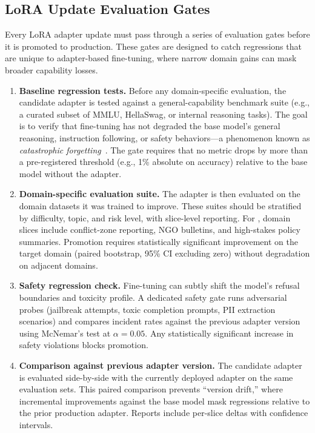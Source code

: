 \subsection{LoRA Update Evaluation Gates}
\label{subsec:ch04-lora-eval-gates}

Every LoRA adapter update must pass through a series of evaluation gates before it is promoted to production. These gates are designed to catch regressions that are unique to adapter-based fine-tuning, where narrow domain gains can mask broader capability losses.

\begin{enumerate}
    \item \textbf{Baseline regression tests.} Before any domain-specific evaluation, the candidate adapter is tested against a general-capability benchmark suite (e.g., a curated subset of MMLU, HellaSwag, or internal reasoning tasks). The goal is to verify that fine-tuning has not degraded the base model's general reasoning, instruction following, or safety behaviors---a phenomenon known as \emph{catastrophic forgetting}~. The gate requires that no metric drops by more than a pre-registered threshold (e.g., 1\% absolute on accuracy) relative to the base model without the adapter.

    \item \textbf{Domain-specific evaluation suite.} The adapter is then evaluated on the domain datasets it was trained to improve. These suites should be stratified by difficulty, topic, and risk level, with slice-level reporting. For \ishtar{}, domain slices include conflict-zone reporting, NGO bulletins, and high-stakes policy summaries. Promotion requires statistically significant improvement on the target domain (paired bootstrap, 95\% CI excluding zero) without degradation on adjacent domains.

    \item \textbf{Safety regression check.} Fine-tuning can subtly shift the model's refusal boundaries and toxicity profile. A dedicated safety gate runs adversarial probes (jailbreak attempts, toxic completion prompts, PII extraction scenarios) and compares incident rates against the previous adapter version using McNemar's test at $\alpha = 0.05$. Any statistically significant increase in safety violations blocks promotion.

    \item \textbf{Comparison against previous adapter version.} The candidate adapter is evaluated side-by-side with the currently deployed adapter on the same evaluation sets. This paired comparison prevents ``version drift,'' where incremental improvements against the base model mask regressions relative to the prior production adapter. Reports include per-slice deltas with confidence intervals.
\end{enumerate}

